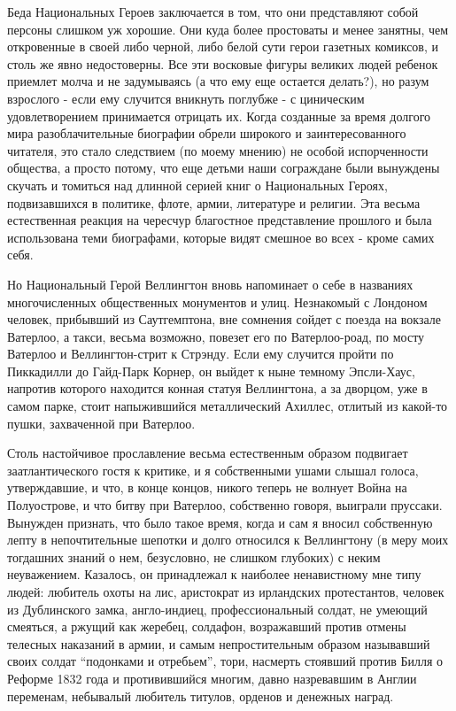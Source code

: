 \documentclass[
  oneside,
  12pt,
  titlepage]{book}
\begin{document}
Беда Национальных Героев заключается в том, что они представляют собой персоны слишком уж хорошие. Они куда более простоваты и менее занятны, чем откровенные в своей либо черной, либо белой сути герои газетных комиксов, и столь же явно недостоверны. Все эти восковые фигуры великих людей ребенок приемлет молча и не задумываясь (а что ему еще остается делать?), но разум взрослого - если ему случится вникнуть поглубже - с циническим удовлетворением принимается отрицать их. Когда созданные за время долгого мира разоблачительные биографии обрели широкого и заинтересованного читателя, это стало следствием (по моему мнению) не особой испорченности общества, а просто потому, что еще детьми наши сограждане были вынуждены скучать и томиться над длинной серией книг о Национальных Героях, подвизавшихся в политике, флоте, армии, литературе и религии. Эта весьма естественная реакция на чересчур благостное представление прошлого и была использована теми биографами, которые видят смешное во всех - кроме самих себя.

Но Национальный Герой Веллингтон вновь напоминает о себе в названиях многочисленных общественных монументов и улиц. Незнакомый с Лондоном человек, прибывший из Саутгемптона, вне сомнения сойдет с поезда на вокзале Ватерлоо, а такси, весьма возможно, повезет его по Ватерлоо-роад, по мосту Ватерлоо и Веллингтон-стрит к Стрэнду. Если ему случится пройти по Пиккадилли до Гайд-Парк Корнер, он выйдет к ныне темному Эпсли-Хаус, напротив которого находится конная статуя Веллингтона, а за дворцом, уже в самом парке, стоит напыжившийся металлический Ахиллес, отлитый из какой-то пушки, захваченной при Ватерлоо.

Столь настойчивое прославление весьма естественным образом подвигает заатлантического гостя к критике, и я собственными ушами слышал голоса, утверждавшие, и что, в конце концов, никого теперь не волнует Война на Полуострове, и что битву при Ватерлоо, собственно говоря, выиграли пруссаки. Вынужден признать, что было такое время, когда и сам я вносил собственную лепту в непочтительные шепотки и долго относился к Веллингтону (в меру моих тогдашних знаний о нем, безусловно, не слишком глубоких) с неким неуважением. Казалось, он принадлежал к наиболее ненавистному мне типу людей: любитель охоты на лис, аристократ из ирландских протестантов, человек из Дублинского замка, англо-индиец, профессиональный солдат, не умеющий смеяться, а ржущий как жеребец, солдафон, возражавший против отмены телесных наказаний в армии, и самым непростительным образом называвший своих солдат ``подонками и отребьем'', тори, насмерть стоявший против Билля о Реформе 1832 года и противившийся многим, давно назревавшим в Англии переменам, небывалый любитель титулов, орденов и денежных наград.
\end{document}
